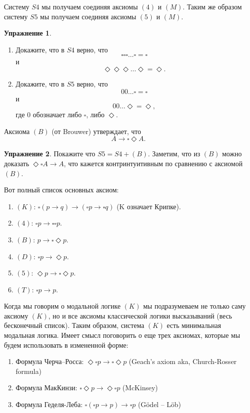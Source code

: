 \documentclass[openany]{book}
\theoremstyle{plain}
\theoremstyle{definition}
\newtheorem{xrc}{Упражнение}[]
\begin{document}
Систему \(S4\) мы получаем соединяя аксиомы \((4)\) и \((M)\). Таким же образом систему \(S5\) мы получаем соединяя аксиомы \((5)\) и \((M)\).

\begin{xrc}
    \begin{enumerate}
	\item Докажите, что в \(S4\) верно, что \[\square \square \square \dots \square = \square \] и \[\Diamond \Diamond \Diamond \dots \Diamond = \Diamond.\]
	\item Докажите, что в \(S5\) верно, что \[0 0 \dots \square = \square\] и \[0 0 \dots \Diamond = \Diamond,\] где \(0\) обозначает либо \(\square\), либо \(\Diamond\).
    \end{enumerate}
\end{xrc}

Аксиома \((B)\) (от Brouwer) утверждает, что \[A \to \square \Diamond A.\]

\begin{xrc}
    Покажите что \(S5 = S4 + (B)\). Заметим, что из \((B)\) можно доказать \(\Diamond \square A \to A\), что кажется контринтуитивным по сравнению с аксиомой \((B)\).
\end{xrc}

Вот полный список основных аксиом:
\begin{enumerate}
    \item \((K)\): \(\square(p \to q) \to (\square p \to \square q)\) (K означает Крипке).
    \item \((4)\): \(\square p \to \square \square p\).
    \item \((B)\): \(p \to \square \Diamond p\).
    \item \((D)\): \(\square p \to \Diamond p\).
    \item \((5)\): \(\Diamond p \to \square \Diamond p\).
    \item \((T)\): \(\square p \to p\).
\end{enumerate}
Когда мы говорим о модальной логике \((K)\) мы подразумеваем не только саму аксиому \((K)\), но и все аксиомы классической логики высказываний (весь бесконечный список). Таким образом, система \((K)\) есть минимальная модальная логика. Имеет смысл поговорить о еще трех аксиомах, которые мы будем использовать в измененной форме:
\begin{enumerate}
    \item Формула Черча–Росса: \(\Diamond \square p \to \square \Diamond p\) (Geach’s axiom aka, Church-Rosser formula)
    \item Формула МакКинзи: \(\square \Diamond p \to \Diamond \square p\) (McKinsey)
    \item Формула Геделя-Леба: \(\square(\square p \to p) \to \square p\) (G\"{o}del – L\"{o}b)
\end{enumerate}
\end{document}
